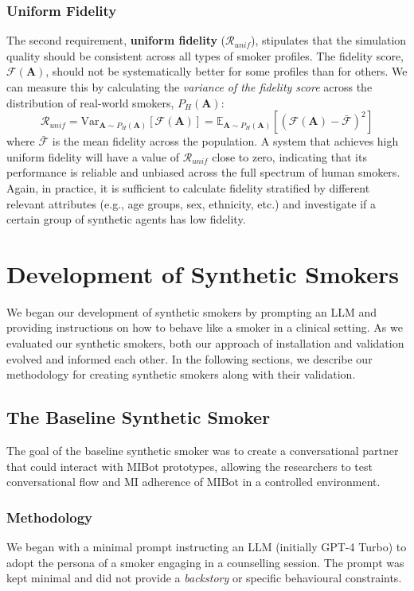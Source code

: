 \subsubsection{Uniform Fidelity}
\label{uniform-fidelity}

The second requirement, \textbf{uniform fidelity} ($\mathcal{R}_{unif}$), stipulates that the simulation quality should be consistent across all types of smoker profiles. The fidelity score, $\mathcal{F}(\textbf{A})$, should not be systematically better for some profiles than for others. We can measure this by calculating the \textit{variance of the fidelity score} across the distribution of real-world smokers, $P_H(\textbf{A})$:
$$\mathcal{R}_{unif} = \text{Var}_{\textbf{A} \sim P_H(\textbf{A})}[\mathcal{F}(\textbf{A})] = \mathbb{E}_{\textbf{A} \sim P_H(\textbf{A})} [(\mathcal{F}(\textbf{A}) - \bar{\mathcal{F}})^2]$$
where $\bar{\mathcal{F}}$ is the mean fidelity across the population. A system that achieves high uniform fidelity will have a value of $\mathcal{R}_{unif}$ close to zero, indicating that its performance is reliable and unbiased across the full spectrum of human smokers. Again, in practice, it is sufficient to calculate fidelity stratified by different relevant attributes (e.g., age groups, sex, ethnicity, etc.) and investigate if a certain group of synthetic agents has low fidelity.


\section{Development of Synthetic Smokers}
We began our development of synthetic smokers by prompting an LLM and providing instructions on how to behave like a smoker in a clinical setting. As we evaluated our synthetic smokers, both our approach of installation and validation evolved and informed each other. In the following sections, we describe our methodology for creating synthetic smokers along with their validation.


\subsection{The Baseline Synthetic Smoker}
\label{sec:synthetic-smoker-baseline}
The goal of the baseline synthetic smoker was to create a conversational partner that could interact with MIBot prototypes, allowing the researchers to test conversational flow and MI adherence of MIBot in a controlled environment.


\subsubsection{Methodology}
We began with a minimal prompt instructing an LLM (initially GPT-4 Turbo) to adopt the persona of a smoker engaging in a counselling session. The prompt was kept minimal and did not provide a \emph{backstory} or specific behavioural constraints.

